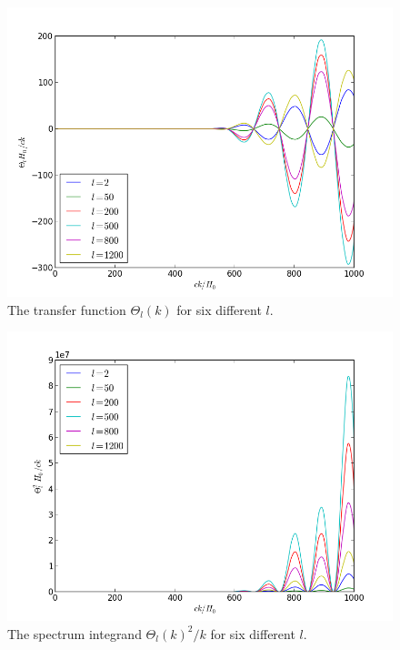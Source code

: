 \documentclass[norsk,a4paper,12pt]{article}
\begin{document}
\begin{figure}[H] 
\begin{center} 
\includegraphics[scale=0.5]{theta.png} 
 

\caption{The transfer function $\Theta_l(k)$ for six different $l$.} 
\end{center} 
\end{figure}


\begin{figure}[H] 
\begin{center} 
\includegraphics[scale=0.5]{theta2.png} 
 

\caption{The spectrum integrand $\Theta_l(k)^2 / k$ for six different $l$.} 
\end{center} 
\end{figure}
\end{document}
